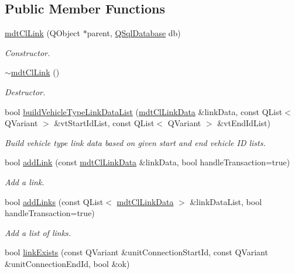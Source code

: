 \subsection*{Public Member Functions}
\begin{DoxyCompactItemize}
\item 
\hyperlink{classmdt_cl_link_a5cef1766f2f03106227227582eed0245}{mdt\-Cl\-Link} (Q\-Object $\ast$parent, \hyperlink{class_q_sql_database}{Q\-Sql\-Database} db)
\begin{DoxyCompactList}\small\item\em Constructor. \end{DoxyCompactList}\item 
\hyperlink{classmdt_cl_link_a1fa6ad3a2ecc7c5f2851c95152a7ed94}{$\sim$mdt\-Cl\-Link} ()
\begin{DoxyCompactList}\small\item\em Destructor. \end{DoxyCompactList}\item 
bool \hyperlink{classmdt_cl_link_aaf2a931c22263b7b5a573fbaf5ae2dc5}{build\-Vehicle\-Type\-Link\-Data\-List} (\hyperlink{classmdt_cl_link_data}{mdt\-Cl\-Link\-Data} \&link\-Data, const Q\-List$<$ Q\-Variant $>$ \&vt\-Start\-Id\-List, const Q\-List$<$ Q\-Variant $>$ \&vt\-End\-Id\-List)
\begin{DoxyCompactList}\small\item\em Build vehicle type link data based on given start and end vehicle I\-D lists. \end{DoxyCompactList}\item 
bool \hyperlink{classmdt_cl_link_a65c1cc934c0f9b37434dbb44964623b1}{add\-Link} (const \hyperlink{classmdt_cl_link_data}{mdt\-Cl\-Link\-Data} \&link\-Data, bool handle\-Transaction=true)
\begin{DoxyCompactList}\small\item\em Add a link. \end{DoxyCompactList}\item 
bool \hyperlink{classmdt_cl_link_adeb5674e94942568e149d68c46caaf50}{add\-Links} (const Q\-List$<$ \hyperlink{classmdt_cl_link_data}{mdt\-Cl\-Link\-Data} $>$ \&link\-Data\-List, bool handle\-Transaction=true)
\begin{DoxyCompactList}\small\item\em Add a list of links. \end{DoxyCompactList}\item 
bool \hyperlink{classmdt_cl_link_aab07d53c8f74dc93bf4dceb0ceb03815}{link\-Exists} (const Q\-Variant \&unit\-Connection\-Start\-Id, const Q\-Variant \&unit\-Connection\-End\-Id, bool \&ok)

\end{DoxyCompactItemize}
